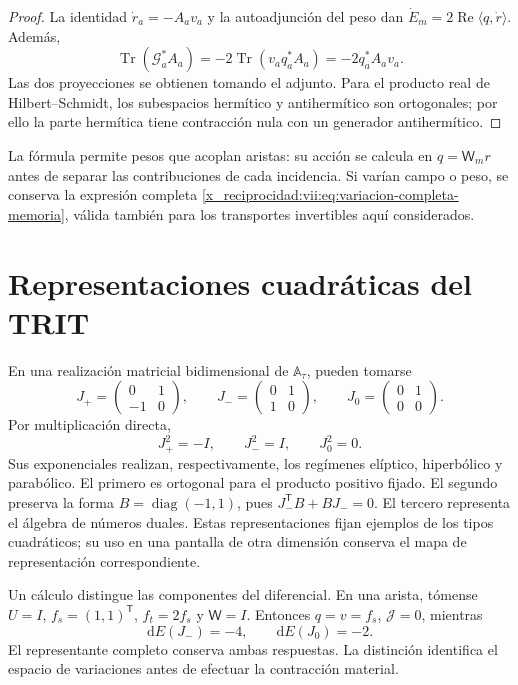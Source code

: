 \begin{proof}
La identidad \(\dot r_a=-A_av_a\) y la autoadjunción del peso dan
\(\dot E_m=2\operatorname{Re}\langle q,\dot r\rangle\).
Además,
\[
 \operatorname{Tr}(\mathcal G_a^*A_a)
 =-2\operatorname{Tr}(v_aq_a^*A_a)=-2q_a^*A_av_a.
\]
Las dos proyecciones se obtienen tomando el adjunto. Para el producto
real de Hilbert--Schmidt, los subespacios hermítico y antihermítico son
ortogonales; por ello la parte hermítica tiene contracción nula con
un generador antihermítico.
\end{proof}

La fórmula permite pesos que acoplan aristas: su acción se calcula en
\(q=\mathsf W_mr\) antes de separar las contribuciones de cada
incidencia. Si varían campo o peso, se conserva la expresión completa
\eqref{x_reciprocidad:vii:eq:variacion-completa-memoria}, válida también para los
transportes invertibles aquí considerados.

\section{Representaciones cuadráticas del TRIT}

En una realización matricial bidimensional de
\(\mathbb A_\tau\), pueden tomarse
\[
 J_{+}=\begin{pmatrix}0&1\\-1&0\end{pmatrix},\qquad
 J_{-}=\begin{pmatrix}0&1\\1&0\end{pmatrix},\qquad
 J_{0}=\begin{pmatrix}0&1\\0&0\end{pmatrix}.
\]
Por multiplicación directa,
\[
 J_+^2=-I,\qquad J_-^2=I,\qquad J_0^2=0.
\]
Sus exponenciales realizan, respectivamente, los regímenes elíptico,
hiperbólico y parabólico. El primero es ortogonal para el producto
positivo fijado. El segundo preserva la forma
\(B=\operatorname{diag}(-1,1)\), pues
\(J_-^{\mathsf T}B+BJ_-=0\). El tercero representa el álgebra
de números duales. Estas representaciones fijan ejemplos de los tipos
cuadráticos; su uso en una pantalla de otra dimensión conserva el mapa
de representación correspondiente.

Un cálculo distingue las componentes del diferencial. En una arista,
tómense \(U=I\), \(f_s=(1,1)^{\mathsf T}\),
\(f_t=2f_s\) y \(\mathsf W=I\). Entonces \(q=v=f_s\),
\(\mathcal J=0\), mientras
\begin{equation}
 \mathrm dE(J_-)=-4,\qquad \mathrm dE(J_0)=-2.
 \label{x_reciprocidad:vii:eq:control-regimenes-corriente}
\end{equation}
El representante completo conserva ambas respuestas. La distinción
identifica el espacio de variaciones antes de efectuar la contracción
material.

